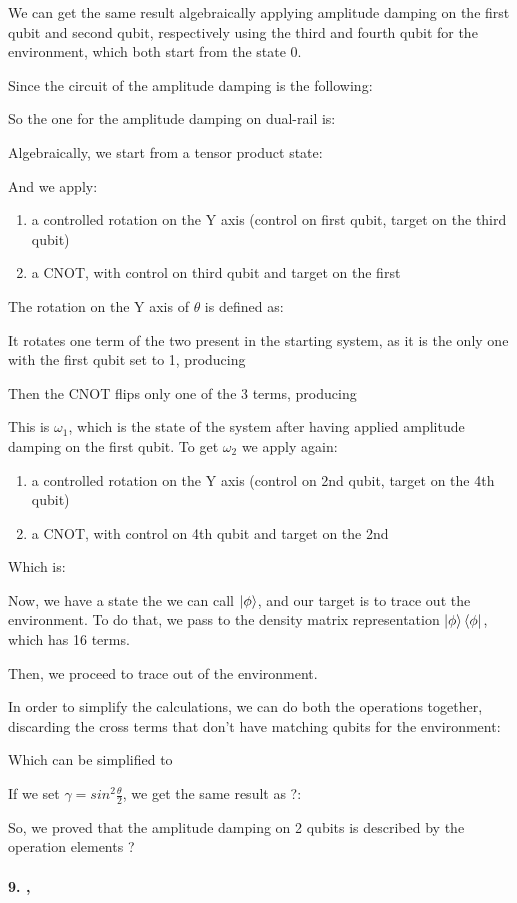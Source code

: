 \documentclass{report}
\begin{document}
We can get the same result algebraically applying amplitude damping on the first qubit and second qubit, respectively using the third and fourth qubit for the environment, which both start from the state 0.

Since the circuit of the amplitude damping is the following:

So the one for the amplitude damping on dual-rail is:

Algebraically, we start from a tensor product state:

And we apply:
\begin{enumerate}
    \item a controlled rotation on the Y axis (control on first qubit, target on the third qubit) 
    \item a CNOT, with control on third qubit and target on the first
\end{enumerate}

The rotation on the Y axis of $\theta$ is defined as:

It rotates one term of the two present in the starting system, as it is the only one with the first qubit set to 1, producing

Then the CNOT flips only one of the 3 terms, producing

This is $\omega_1$, which is the state of the system after having applied amplitude damping on the first qubit.
To get $\omega_2$ we apply again:
\begin{enumerate}
    \item a controlled rotation on the Y axis (control on 2nd qubit, target on the 4th qubit) 
    \item a CNOT, with control on 4th qubit and target on the 2nd
\end{enumerate}

Which is:

Now, we have a state the we can call $\ket{\phi}$, and our target is to trace out the environment.
To do that, we pass to the density matrix representation $\ket{\phi}\bra{\phi}$, which has 16 terms.

Then, we proceed to trace out of the environment.

In order to simplify the calculations, we can do both the operations together, discarding the cross terms that don't have matching qubits for the environment:

Which can be simplified to 

If we set $\gamma=sin^2\frac{\theta}{2}$, we get the same result as ?: %

So, we proved that the amplitude damping on 2 qubits is described by the operation elements ? %


\paragraph{9. ,}
\end{document}
